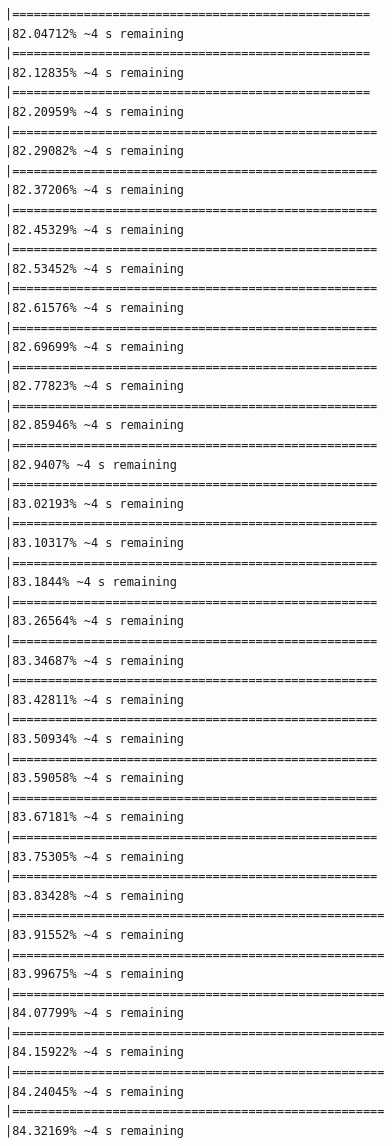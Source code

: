 \documentclass{article}\usepackage[]{graphicx}\usepackage[]{xcolor}
\makeatletter
\newenvironment{kframe}{%
 \def\at@end@of@kframe{}%
 \ifinner\ifhmode%
  \def\at@end@of@kframe{\end{minipage}}%
  \begin{minipage}{\columnwidth}%
 \fi\fi%
 \def\FrameCommand##1{\hskip\@totalleftmargin \hskip-\fboxsep
 \colorbox{shadecolor}{##1}\hskip-\fboxsep
     \hskip-\linewidth \hskip-\@totalleftmargin \hskip\columnwidth}%
 \MakeFramed {\advance\hsize-\width
   \@totalleftmargin\z@ \linewidth\hsize
   \@setminipage}}%
 {\par\unskip\endMakeFramed%
 \at@end@of@kframe}
\newenvironment{knitrout}{}{} %
\makeatother
\begin{document}
\begin{knitrout}
\begin{kframe}
\begin{verbatim}
|==================================================            |82.04712% ~4 s remaining  
|==================================================            |82.12835% ~4 s remaining  
|==================================================            |82.20959% ~4 s remaining  
|===================================================           |82.29082% ~4 s remaining  
|===================================================           |82.37206% ~4 s remaining  
|===================================================           |82.45329% ~4 s remaining  
|===================================================           |82.53452% ~4 s remaining  
|===================================================           |82.61576% ~4 s remaining  
|===================================================           |82.69699% ~4 s remaining  
|===================================================           |82.77823% ~4 s remaining  
|===================================================           |82.85946% ~4 s remaining  
|===================================================           |82.9407% ~4 s remaining   
|===================================================           |83.02193% ~4 s remaining  
|===================================================           |83.10317% ~4 s remaining  
|===================================================           |83.1844% ~4 s remaining   
|===================================================           |83.26564% ~4 s remaining  
|===================================================           |83.34687% ~4 s remaining  
|===================================================           |83.42811% ~4 s remaining  
|===================================================           |83.50934% ~4 s remaining  
|===================================================           |83.59058% ~4 s remaining  
|===================================================           |83.67181% ~4 s remaining  
|===================================================           |83.75305% ~4 s remaining  
|===================================================           |83.83428% ~4 s remaining  
|====================================================          |83.91552% ~4 s remaining  
|====================================================          |83.99675% ~4 s remaining  
|====================================================          |84.07799% ~4 s remaining  
|====================================================          |84.15922% ~4 s remaining  
|====================================================          |84.24045% ~4 s remaining  
|====================================================          |84.32169% ~4 s remaining  

\end{verbatim}
\end{kframe}
\end{knitrout}
\end{document}
